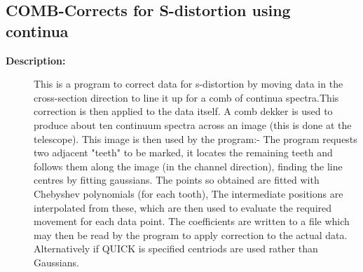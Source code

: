 \subsection{COMB-\label{COMB}Corrects for S-distortion using continua}
\begin{description}

\item [{\bf Description:}]
   This is a program to correct data for s-distortion by moving data in
  the cross-section direction to line it up for a comb of continua
  spectra.This correction is then applied to the data itself. A comb
  dekker is used to produce about ten continuum spectra across an image
  (this is done at the telescope). This image is then used by the
  program:- The program requests two adjacent "teeth" to be marked, it
  locates the remaining teeth and follows them along the image (in the
  channel direction), finding the line centres by fitting gaussians. The
  points so obtained are fitted with Chebyshev polynomials (for each
  tooth), The intermediate positions are interpolated from these, which
  are then used to evaluate the required movement for each data point.
  The coefficients are written to a file which may then be read by the
  program to apply correction to the actual data.
  Alternatively if QUICK is specified centriods are used rather than
  Gaussians.


\end{description}
